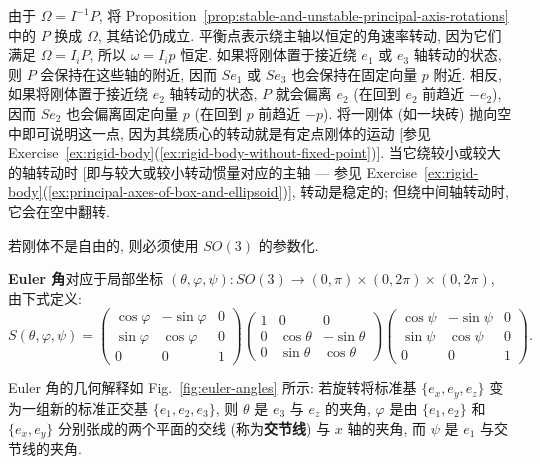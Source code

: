 \begin{RiemannRemark}\label{rem:rotation-about-the-intermediate-axis}
由于 $\Omega=I^{-1}P$, 将 Proposition~\ref{prop:stable-and-unstable-principal-axis-rotations} 中的 $P$ 换成 $\Omega$, 其结论仍成立. 平衡点表示绕主轴以恒定的角速率转动, 因为它们满足 $\Omega=I_iP$, 所以 $\omega=I_ip$ 恒定. 如果将刚体置于接近绕 $e_1$ 或 $e_3$ 轴转动的状态, 则 $P$ 会保持在这些轴的附近, 因而 $Se_1$ 或 $Se_3$ 也会保持在固定向量 $p$ 附近. 相反, 如果将刚体置于接近绕 $e_2$ 轴转动的状态, $P$ 就会偏离 $e_2$ (在回到 $e_2$ 前趋近 $-e_2$), 因而 $Se_2$ 也会偏离固定向量 $p$ (在回到 $p$ 前趋近 $-p$). 将一刚体 (如一块砖) 抛向空中即可说明这一点, 因为其绕质心的转动就是有定点刚体的运动 [参见 Exercise~\ref{ex:rigid-body}(\ref{ex:rigid-body-without-fixed-point})]. 当它绕较小或较大的轴转动时 [即与较大或较小转动惯量对应的主轴 --- 参见 Exercise~\ref{ex:rigid-body}(\ref{ex:principal-axes-of-box-and-ellipsoid})], 转动是稳定的; 但绕中间轴转动时, 它会在空中翻转.
\end{RiemannRemark}

若刚体不是自由的, 则必须使用 $SO(3)$ 的参数化.

\begin{RiemannDefinition}\label{def:euler-angles}
\textbf{Euler 角}对应于局部坐标 $(\theta,\varphi,\psi):SO(3)\to(0,\pi)\times(0,2\pi)\times(0,2\pi)$, 由下式定义:
\[
  S(\theta,\varphi,\psi)=
  \begin{pmatrix}
    \cos\varphi & -\sin\varphi & 0\\
    \sin\varphi & \cos\varphi & 0\\
    0 & 0 & 1
  \end{pmatrix}
  \begin{pmatrix}
    1 & 0 & 0\\
    0 & \cos\theta & -\sin\theta\\
    0 & \sin\theta & \cos\theta
  \end{pmatrix}
  \begin{pmatrix}
    \cos\psi & -\sin\psi & 0\\
    \sin\psi & \cos\psi & 0\\
    0 & 0 & 1
  \end{pmatrix}.
\]
\end{RiemannDefinition}

Euler 角的几何解释如 Fig.~\ref{fig:euler-angles} 所示: 若旋转将标准基 $\{e_x,e_y,e_z\}$ 变为一组新的标准正交基 $\{e_1,e_2,e_3\}$, 则 $\theta$ 是 $e_3$ 与 $e_z$ 的夹角, $\varphi$ 是由 $\{e_1,e_2\}$ 和 $\{e_x,e_y\}$ 分别张成的两个平面的交线 (称为\textbf{交节线}) 与 $x$ 轴的夹角, 而 $\psi$ 是 $e_1$ 与交节线的夹角.

